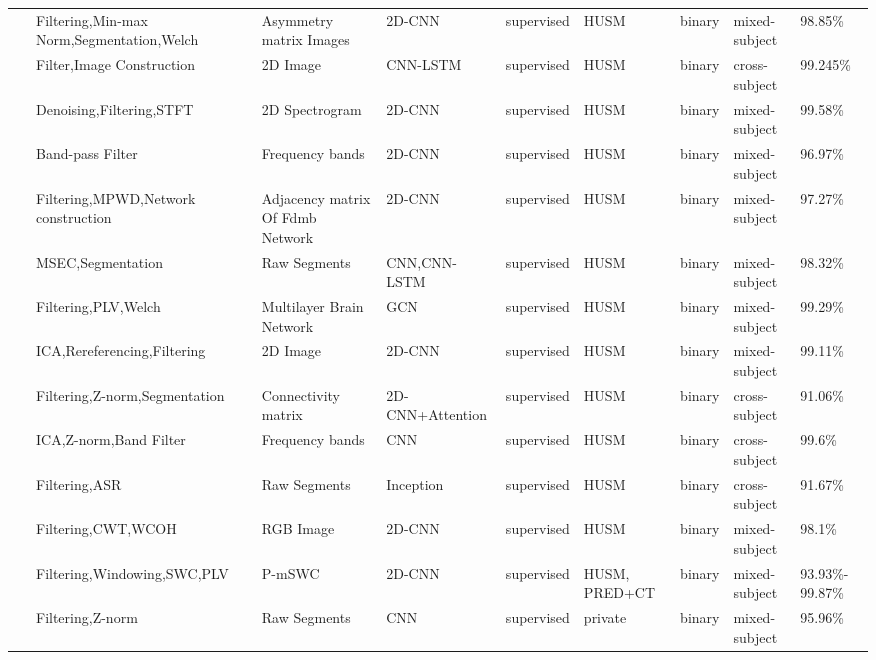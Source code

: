 \begin{table*}[ht]
\begin{tabular}{p{0.4cm}p{2.8cm}p{2cm}p{1.5cm}p{1.9cm}p{1.9cm}p{0.8cm}p{1.8cm}p{2cm}}
~\cite{MDD20} & Filtering,Min-max Norm,Segmentation,\newline Welch & Asymmetry \newline matrix Images & 2D-CNN & supervised & HUSM & binary & mixed-subject & 98.85\% \\
~\cite{MDD21} & Filter,Image Construction & 2D Image & CNN-LSTM & supervised & HUSM & binary & cross-subject & 99.245\% \\
~\cite{MDD22} & Denoising,Filtering,STFT & 2D Spectrogram & 2D-CNN & supervised & HUSM & binary & mixed-subject & 99.58\% \\
~\cite{MDD23} & Band-pass Filter & Frequency bands & 2D-CNN & supervised & HUSM & binary & mixed-subject & 96.97\% \\
~\cite{MDD24} & Filtering,MPWD,Network construction & Adjacency matrix Of Fdmb Network & 2D-CNN & supervised & HUSM & binary & mixed-subject & 97.27\% \\
~\cite{MDD25} & MSEC,Segmentation & Raw Segments & CNN,CNN-LSTM & supervised & HUSM & binary & mixed-subject & 98.32\% \\
~\cite{MDD26} & Filtering,PLV,Welch & Multilayer Brain Network & GCN & supervised & HUSM & binary & mixed-subject & 99.29\% \\
~\cite{MDD27} & ICA,Rereferencing,Filtering & 2D Image & 2D-CNN & supervised & HUSM & binary & mixed-subject & 99.11\% \\
~\cite{MDD28} & Filtering,Z-norm,\newline Segmentation & Connectivity \newline matrix & 2D-CNN+Attention & supervised & HUSM & binary & cross-subject & 91.06\% \\
~\cite{MDD29} & ICA,Z-norm,Band Filter & Frequency bands & CNN & supervised & HUSM & binary & cross-subject & 99.6\% \\
~\cite{MDD30} & Filtering,ASR & Raw Segments & Inception & supervised & HUSM & binary & cross-subject & 91.67\% \\
~\cite{MDD31} & Filtering,CWT,WCOH & RGB Image & 2D-CNN & supervised & HUSM & binary & mixed-subject & 98.1\% \\
~\cite{MDD32} & Filtering,Windowing,\newline SWC,PLV & P-mSWC & 2D-CNN & supervised & HUSM, \newline PRED+CT & binary & mixed-subject & 93.93\%- 99.87\% \\
~\cite{acharya2018automated} & Filtering,Z-norm & Raw Segments & CNN & supervised & private & binary & mixed-subject & 95.96\% \\

\hline
\end{tabular}
\end{table*}

